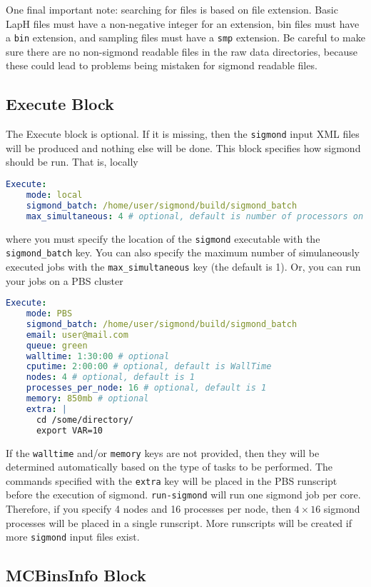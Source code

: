 \documentclass[12pt,letterpaper,notitlepage]{article}
\newcommand{\key}[1]{\textcolor{Emerald}{\texttt{\small{#1}}}}
\newcommand{\runsigmond}{\texttt{run-sigmond}}
\newcommand{\sigmond}{\texttt{sigmond}}
\begin{document}
One final important note: searching for files is based on file extension.
Basic LapH files must have a non-negative integer for an extension,
bin files must have a \texttt{bin} extension,
and sampling files must have a \texttt{smp} extension.
Be careful to make sure there are no non-sigmond readable files in the raw data directories,
because these could lead to problems being mistaken for sigmond readable files.

\subsection{Execute Block}

The Execute block is optional. If it is missing, then the \sigmond{} input \textsc{XML} files will be produced and nothing else will be done.
This block specifies how sigmond should be run. That is, locally
\begin{lstlisting}[language=yaml]
  Execute:
    mode: local
    sigmond_batch: /home/user/sigmond/build/sigmond_batch
    max_simultaneous: 4 # optional, default is number of processors on machine
\end{lstlisting}
where you must specify the location of the \sigmond{} executable with the \key{sigmond\_batch} key.
You can also specify the maximum number of simulaneously executed jobs with the \key{max\_simultaneous} key (the default is 1).
Or, you can run your jobs on a PBS cluster
\begin{lstlisting}[language=yaml]
  Execute:
    mode: PBS
    sigmond_batch: /home/user/sigmond/build/sigmond_batch
    email: user@mail.com
    queue: green
    walltime: 1:30:00 # optional
    cputime: 2:00:00 # optional, default is WallTime
    nodes: 4 # optional, default is 1
    processes_per_node: 16 # optional, default is 1
    memory: 850mb # optional
    extra: |
      cd /some/directory/
      export VAR=10
\end{lstlisting}
If the \key{walltime} and/or \key{memory} keys are not provided, then they will be determined automatically based on the type of tasks to be performed.
The commands specified with the \key{extra} key will be placed in the PBS runscript before the execution of sigmond.
\runsigmond{} will run one sigmond job per core.
Therefore, if you specify 4 nodes and 16 processes per node, then $4 \times 16$ sigmond processes will be placed in a single runscript.
More runscripts will be created if more \sigmond{} input files exist.

\subsection{MCBinsInfo Block}
\end{document}
